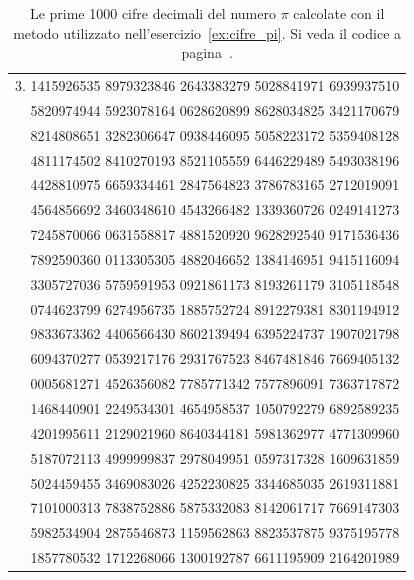 \begin{table}
\begin{center}
\begin{tabular}{r}
3. \small
1415926535 8979323846 2643383279 5028841971 6939937510 \\ \small
5820974944 5923078164 0628620899 8628034825 3421170679 \\ \small
8214808651 3282306647 0938446095 5058223172 5359408128 \\ \small
4811174502 8410270193 8521105559 6446229489 5493038196 \\ \small
4428810975 6659334461 2847564823 3786783165 2712019091 \\ \small
4564856692 3460348610 4543266482 1339360726 0249141273 \\ \small
7245870066 0631558817 4881520920 9628292540 9171536436 \\ \small
7892590360 0113305305 4882046652 1384146951 9415116094 \\ \small
3305727036 5759591953 0921861173 8193261179 3105118548 \\ \small
0744623799 6274956735 1885752724 8912279381 8301194912 \\ \small
9833673362 4406566430 8602139494 6395224737 1907021798 \\ \small
6094370277 0539217176 2931767523 8467481846 7669405132 \\ \small
0005681271 4526356082 7785771342 7577896091 7363717872 \\ \small
1468440901 2249534301 4654958537 1050792279 6892589235 \\ \small
4201995611 2129021960 8640344181 5981362977 4771309960 \\ \small
5187072113 4999999837 2978049951 0597317328 1609631859 \\ \small
5024459455 3469083026 4252230825 3344685035 2619311881 \\ \small
7101000313 7838752886 5875332083 8142061717 7669147303 \\ \small
5982534904 2875546873 1159562863 8823537875 9375195778 \\ \small
1857780532 1712268066 1300192787 6611195909 2164201989
\end{tabular}
\end{center}
\caption{Le prime 1000 cifre decimali del numero $\pi$
calcolate con il metodo utilizzato nell'esercizio~\ref{ex:cifre_pi}.
Si veda il codice a pagina~\pageref{code:compute_pi}.}
\label{tab:cifre_pi}
\end{table}

